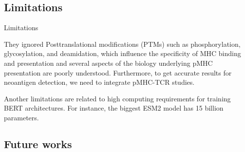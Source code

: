 \documentclass[10pt]{beamer}
\newcommand{\1}{
	\setbeamertemplate{background}{
		\texttt{[image: img/1]}
		\tikz[overlay] \fill[fill opacity=0.75,fill=white] (0,0) rectangle (-\paperwidth,\paperheight);
	}
}
\begin{document}
\subsection{ Limitations }

\begin{frame}{Limitations}{}
	
	\begin{block}{}
		They ignored Posttranslational modifications (PTMs) such as phosphorylation, glycosylation, and deamidation, which influence the specificity of MHC binding and presentation and several aspects of the biology underlying pMHC presentation are poorly understood. Furthermore, to get accurate results for neoantigen detection, we need to integrate pMHC-TCR studies. 
	\end{block}

	\begin{block}{}
		Another limitations are related to high computing requirements for training BERT architectures. For instance, the biggest ESM2 model has 15 billion parameters.
	\end{block}

\end{frame}

\subsection{ Future works }
\end{document}
